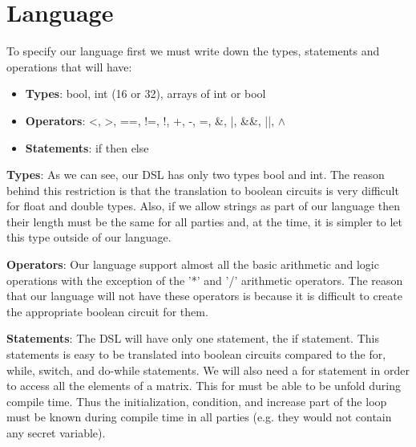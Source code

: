 \documentclass[paper=a4, fontsize=11pt]{scrartcl} %
\numberwithin{equation}{section} %
\numberwithin{figure}{section} %
\numberwithin{table}{section} %
\begin{document}
\section{Language}
To specify our language first we must write down the types, statements and operations that will have:
\begin{itemize}
\item \textbf{Types}: bool, int (16 or 32), arrays of int or bool
\item \textbf{Operators}: <, >, ==, !=, !, +, -, =, \&, |, \&\&, ||, $\wedge$
\item \textbf{Statements}: if then else
\end{itemize}

\noindent
\textbf{Types}:
As we can see, our DSL has only two types bool and int. The reason behind this restriction is that the translation to boolean circuits is very difficult for float and double types. Also, if we allow strings as part of our language then their length must be the same for all parties and, at the time, it is simpler to let this type outside of our language.

\textbf{Operators}: Our language support almost all the basic arithmetic and 
logic operations with the exception of the '*' and '/' arithmetic operators. The reason that our language will not have these operators is because it is difficult to create the appropriate boolean circuit for them.

\textbf{Statements}: The DSL will have only one statement, the if statement. This statements is easy to be translated into boolean circuits compared to the for, while, switch, and do-while statements. We will also need a for statement in order to access all the elements of a matrix. This for must be able to be unfold during compile time. Thus the initialization, condition, and increase part of the loop must be known during compile time in all parties (e.g. they would not contain any secret variable).
\end{document}
